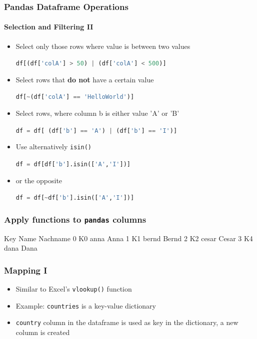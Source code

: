 \documentclass[english]{beamer}
\begin{document}
\begin{frame}[fragile]
\frametitle{Pandas Dataframe Operations}
\framesubtitle{Selection and Filtering II}

\begin{itemize}
\item Select only those rows where value is between two values

\lstinline[language={Python}]{df[(df['colA'] > 50) | (df['colA'] < 500)]}

\item Select rows that \textbf{do not} have a certain value

\lstinline[language={Python}]{df[~(df['colA'] == 'HelloWorld')]}

\item Select rows, where column b is either value 'A' or 'B' 

\lstinline[language={Python}]{df = df[ (df['b'] == 'A') | (df['b'] == 'I')]}

\item Use alternatively  \lstinline[language={Python}]{isin()}

\lstinline[language={Python}]{df = df[df['b'].isin(['A','I'])]}

\item or the opposite

\lstinline[language={Python}]{df = df[~df['b'].isin(['A','I'])]}

\end{itemize}
\end{frame}


\begin{frame}[containsverbatim]
\frametitle{Apply functions to \texttt{pandas} columns}



\begin{ausgabe}
  Key   Name Nachname
0  K0   anna     Anna
1  K1  bernd    Bernd
2  K2  cesar    Cesar
3  K4   dana     Dana
\end{ausgabe}

\end{frame}


\begin{frame}[fragile]
\frametitle{Mapping I}

\begin{itemize}
	\item Similar to Excel's \texttt{vlookup()} function
	\item Example: \texttt{countries} is a key-value dictionary
	\item \texttt{country} column in the dataframe is used as key in the dictionary, a new column is created
\end{itemize}



\end{frame}
\end{document}
